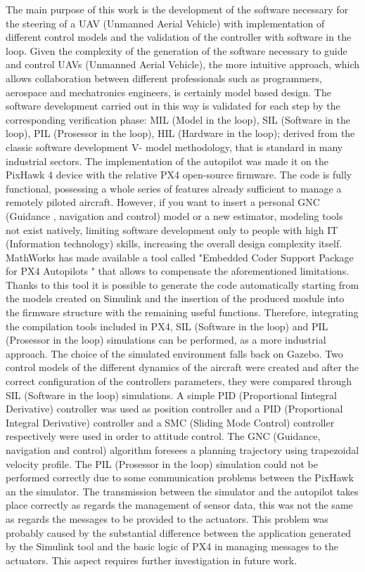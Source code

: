 \begin{commento}
The main purpose of this work is the development of the software necessary for the steering of a UAV (Unmanned Aerial Vehicle) with implementation of different control models and  the validation of the controller with software in the loop.
Given the complexity of the generation of the software necessary to guide and control UAVs (Unmanned Aerial Vehicle), the more intuitive approach, which allows collaboration between different professionals such as programmers, aerospace and mechatronics engineers, is certainly model based design.
The software development carried out in this way is validated for each step by the corresponding verification phase: MIL (Model in the loop), SIL (Software in the loop), PIL (Prosessor in the loop), HIL (Hardware in the loop); derived from the classic software development V- model methodology, that is standard in many industrial sectors.
The implementation of the autopilot was made it on the PixHawk 4 device with the relative PX4 open-source firmware. The code is fully functional, possessing a whole series of features already sufficient to manage a remotely piloted aircraft. However, if you want to insert a personal GNC (Guidance , navigation and control) model or a new estimator, modeling tools not exist natively, limiting software development only to people with high IT (Information technology) skills, increasing the  overall design complexity itself.
MathWorks has made available a tool called "Embedded Coder Support Package
for PX4 Autopilots " that allows to compensate the aforementioned limitations. Thanks to this tool it is possible to generate the code automatically starting from the models created on Simulink and the insertion of the produced module into the firmware structure with the remaining useful functions. Therefore, integrating the compilation tools included in PX4, SIL (Software in the loop) and PIL (Prosessor in the loop) simulations can be performed, as a more industrial approach.
The choice of the simulated environment falls back on Gazebo.
Two control models of the different dynamics of the aircraft were created and after the correct configuration of the controllers parameters, they were compared through SIL (Software in the loop) simulations. A simple PID (Proportional Iintegral Derivative) controller was used as position controller and a PID (Proportional Integral Derivative) controller and a SMC (Sliding Mode Control) controller respectively were used in order to attitude control. The GNC (Guidance, navigation and control) algorithm foresees a planning trajectory using trapezoidal velocity profile.
The PIL (Prosessor in the loop) simulation could not be performed correctly due to some communication problems between the PixHawk an the simulator. The transmission between the simulator and the autopilot takes place correctly as regards the management of sensor data, this was not the same as regards the messages to be provided to the actuators. This problem was probably caused by the substantial difference between the application generated by the Simulink tool and the basic logic of PX4 in managing messages to the actuators. This aspect requires further investigation in future work.



\end{commento}
